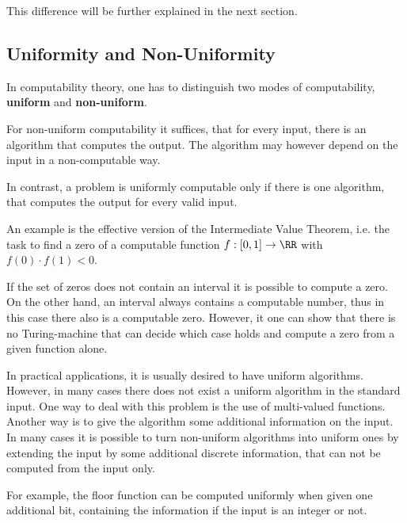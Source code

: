 This difference will be further explained in the next section.
\subsection{Uniformity and Non-Uniformity}
In computability theory, one has to distinguish two modes of computability, \textbf{uniform} and \textbf{non-uniform}.

For non-uniform computability it suffices, that for every input, there is an algorithm that computes the output. 
The algorithm may however depend on the input in a non-computable way.

In contrast, a problem is uniformly computable only if there is one algorithm, that computes the output for every valid input. 

An example is the effective version of the Intermediate Value Theorem, i.e. the
task to find a zero of a computable function $f : [0,1] \to \RR$ with
$f(0)\cdot f(1) < 0$.

If the set of zeros does not contain an interval it is possible to
compute a zero.
On the other hand, an interval always contains a computable number, thus in
this case there also is a computable zero.
However, it one can show that there is no Turing-machine that can decide which
case holds and compute a zero from a given function alone.

In practical applications, it is usually desired to have uniform algorithms.
However, in many cases there does not exist a uniform algorithm in the standard
input.
One way to deal with this problem is the use of multi-valued functions.
Another way is to give the algorithm some additional information on the input.
In many cases it is possible to turn non-uniform algorithms into uniform ones
by extending the input by some additional discrete information, that can not be
computed from the input only.

For example, the floor function can be computed uniformly when given one
additional bit, containing the information if the input is an integer or
not.  
